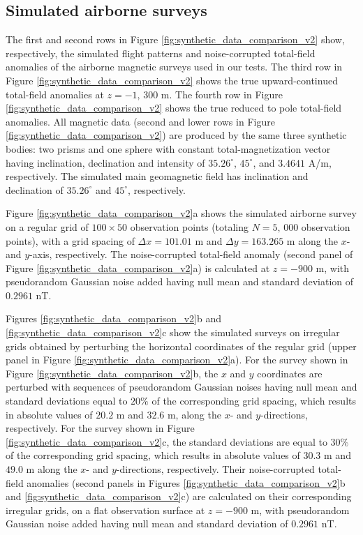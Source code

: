 \documentclass[manuscript,noblind]{geophysics}
\begin{document}
\subsection*{Simulated airborne surveys}

The first and second rows in Figure \ref{fig:synthetic_data_comparison_v2} show, respectively, 
the simulated flight patterns and noise-corrupted total-field anomalies of the airborne magnetic 
surveys used in our tests. The third row in Figure \ref{fig:synthetic_data_comparison_v2} shows 
the true upward-continued total-field anomalies at $z = -1, \, 300$ m. The fourth row in Figure \ref{fig:synthetic_data_comparison_v2} shows the true reduced to pole total-field anomalies.
All magnetic data (second and lower rows in Figure \ref{fig:synthetic_data_comparison_v2}) 
are produced by the same three synthetic bodies: two prisms and one sphere with 
constant total-magnetization vector having inclination, declination and intensity of 
$35.26^{\circ}$, $45^{\circ}$, and $3.4641$ A/m, respectively. 
The simulated main geomagnetic field has inclination and declination of $35.26^{\circ}$ and $45^{\circ}$,
respectively. 


Figure \ref{fig:synthetic_data_comparison_v2}a shows the simulated airborne survey on
a regular grid of $100 \times 50$ observation points (totaling  $N = 5,\, 000$ observation points),
with a grid spacing of $\Delta x = 101.01$ m and $\Delta y = 163.265$ m along the
$x$- and $y$-axis, respectively.
The noise-corrupted total-field anomaly (second panel of Figure \ref{fig:synthetic_data_comparison_v2}a) 
is calculated at $z = -900$ m, with pseudorandom Gaussian noise added having null mean and standard deviation of $0.2961$ nT.


Figures \ref{fig:synthetic_data_comparison_v2}b and \ref{fig:synthetic_data_comparison_v2}c 
show the simulated surveys on irregular grids obtained by perturbing the horizontal coordinates
of the regular grid (upper panel in Figure \ref{fig:synthetic_data_comparison_v2}a).
For the survey shown in Figure \ref{fig:synthetic_data_comparison_v2}b, the $x$ and $y$ coordinates 
are perturbed with sequences of pseudorandom Gaussian noises having null mean and standard deviations
equal to $20\%$ of the corresponding grid spacing, which results in
absolute values of $20.2$ m and $32.6$ m, along the $x$- and $y$-directions, respectively.
For the survey shown in Figure \ref{fig:synthetic_data_comparison_v2}c, the standard deviations
are equal to $30\%$ of the corresponding grid spacing, which results in absolute values of 
$30.3$ m and $49.0$ m along the $x$- and $y$-directions, respectively.
Their noise-corrupted total-field anomalies (second panels in Figures 
\ref{fig:synthetic_data_comparison_v2}b and \ref{fig:synthetic_data_comparison_v2}c) are calculated 
on their corresponding irregular grids, on a flat observation surface at $z = -900$ m, 
with pseudorandom Gaussian noise added having null mean and standard deviation of $0.2961$ nT.
\end{document}
